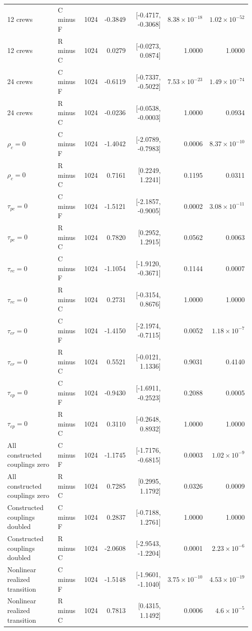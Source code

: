 \documentclass[journal]{IEEEtran}
\begin{document}
\begin{table}[t]
{\begin{tabular}{@{}llrrrrr@{}}
12 crews & C minus F & 1024 & -0.3849 & [-0.4717, -0.3068] & $8.38\times10^{-18}$ & $1.02\times10^{-52}$ \\
12 crews & R minus C & 1024 & 0.0279 & [-0.0273, 0.0874] & 1.0000 & 1.0000 \\
24 crews & C minus F & 1024 & -0.6119 & [-0.7337, -0.5022] & $7.53\times10^{-23}$ & $1.49\times10^{-74}$ \\
24 crews & R minus C & 1024 & -0.0236 & [-0.0538, -0.0003] & 1.0000 & 0.0934 \\
$\rho_c=0$ & C minus F & 1024 & -1.4042 & [-2.0789, -0.7983] & 0.0006 & $8.37\times10^{-10}$ \\
$\rho_c=0$ & R minus C & 1024 & 0.7161 & [0.2249, 1.2241] & 0.1195 & 0.0311 \\
$\tau_{pc}=0$ & C minus F & 1024 & -1.5121 & [-2.1857, -0.9005] & 0.0002 & $3.08\times10^{-11}$ \\
$\tau_{pc}=0$ & R minus C & 1024 & 0.7820 & [0.2952, 1.2915] & 0.0562 & 0.0063 \\
$\tau_{rc}=0$ & C minus F & 1024 & -1.1054 & [-1.9120, -0.3671] & 0.1144 & 0.0007 \\
$\tau_{rc}=0$ & R minus C & 1024 & 0.2731 & [-0.3154, 0.8676] & 1.0000 & 1.0000 \\
$\tau_{cr}=0$ & C minus F & 1024 & -1.4150 & [-2.1974, -0.7115] & 0.0052 & $1.18\times10^{-7}$ \\
$\tau_{cr}=0$ & R minus C & 1024 & 0.5521 & [-0.0121, 1.1336] & 0.9031 & 0.4140 \\
$\tau_{cp}=0$ & C minus F & 1024 & -0.9430 & [-1.6911, -0.2523] & 0.2088 & 0.0005 \\
$\tau_{cp}=0$ & R minus C & 1024 & 0.3110 & [-0.2648, 0.8932] & 1.0000 & 1.0000 \\
All constructed couplings zero & C minus F & 1024 & -1.1745 & [-1.7176, -0.6815] & 0.0003 & $1.02\times10^{-9}$ \\
All constructed couplings zero & R minus C & 1024 & 0.7285 & [0.2995, 1.1792] & 0.0326 & 0.0009 \\
Constructed couplings doubled & C minus F & 1024 & 0.2837 & [-0.7188, 1.2761] & 1.0000 & 1.0000 \\
Constructed couplings doubled & R minus C & 1024 & -2.0608 & [-2.9543, -1.2204] & 0.0001 & $2.23\times10^{-6}$ \\
Nonlinear realized transition & C minus F & 1024 & -1.5148 & [-1.9601, -1.1040] & $3.75\times10^{-10}$ & $4.53\times10^{-19}$ \\
Nonlinear realized transition & R minus C & 1024 & 0.7813 & [0.4315, 1.1492] & 0.0006 & $4.6\times10^{-5}$ \\

\end{tabular}}
\end{table}
\end{document}
